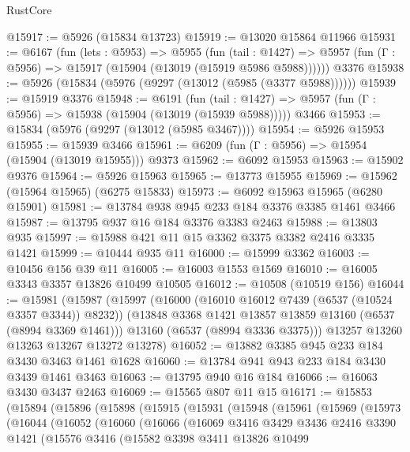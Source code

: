 \begin{lexlean}{RustCore}
\begin{coremodule}
@15917 := @5926 (@15834 @13723)
@15919 := @13020 @15864 @11966
@15931 := @6167
    (fun (lets : @5953) =>
    @5955
      (fun (tail : @1427) =>
      @5957 (fun (Γ : @5956) => @15917 (@15904 (@13019 (@15919 @5986 @5988))))))
    @3376
@15938 := @5926 (@15834 (@5976 (@9297 (@13012 (@5985 (@3377 @5988))))))
@15939 := @15919 @3376
@15948 := @6191
    (fun (tail : @1427) => @5957 (fun (Γ : @5956) => @15938 (@15904 (@13019 (@15939 @5988)))))
    @3466
@15953 := @15834 (@5976 (@9297 (@13012 (@5985 @3467))))
@15954 := @5926 @15953
@15955 := @15939 @3466
@15961 := @6209 (fun (Γ : @5956) => @15954 (@15904 (@13019 @15955))) @9373
@15962 := @6092 @15953
@15963 := @15902 @9376
@15964 := @5926 @15963
@15965 := @13773 @15955
@15969 := @15962 (@15964 @15965) (@6275 @15833)
@15973 := @6092 @15963 @15965 (@6280 @15901)
@15981 := @13784 @938 @945 @233 @184 @3376 @3385 @1461 @3466
@15987 := @13795 @937 @16 @184 @3376 @3383 @2463
@15988 := @13803 @935
@15997 := @15988 @421 @11 @15 @3362 @3375 @3382 @2416 @3335 @1421
@15999 := @10444 @935 @11
@16000 := @15999 @3362
@16003 := @10456 @156 @39 @11
@16005 := @16003 @1553 @1569
@16010 := @16005 @3343 @3357 @13826 @10499 @10505
@16012 := @10508 (@10519 @156)
@16044 := @15981
    (@15987
      (@15997
        (@16000 (@16010 @16012 @7439 (@6537 (@10524 @3357 @3344)) @8232))
        (@13848 @3368 @1421 @13857 @13859 @13160 (@6537 (@8994 @3369 @1461)))
        @13160
        (@6537 (@8994 @3336 @3375)))
      @13257
      @13260
      @13263
      @13267
      @13272
      @13278)
@16052 := @13882 @3385 @945 @233 @184 @3430 @3463 @1461 @1628
@16060 := @13784 @941 @943 @233 @184 @3430 @3439 @1461 @3463
@16063 := @13795 @940 @16 @184
@16066 := @16063 @3430 @3437 @2463
@16069 := @15565 @807 @11 @15
@16171 := @15853
    (@15894
      (@15896
        (@15898
          (@15915
            (@15931
              (@15948
                (@15961
                  (@15969
                    (@15973
                      (@16044
                        (@16052
                          (@16060
                            (@16066
                              (@16069
                                @3416
                                @3429
                                @3436
                                @2416
                                @3390
                                @1421
                                (@15576
                                  @3416
                                  (@15582
                                    @3398
                                    @3411
                                    @13826
                                    @10499

\end{coremodule}
\end{lexlean}
